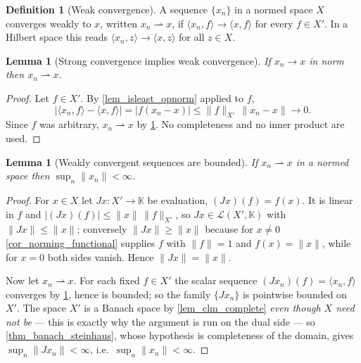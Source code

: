 \documentclass[a4paper]{report}
\theoremstyle{plain}
\newtheorem{lemma}[theorem]{Lemma}
\theoremstyle{definition}
\newtheorem{definition}[theorem]{Definition}
\theoremstyle{remark}
\begin{document}
\begin{definition}[Weak convergence]
  \label{def_weak_conv}
  A sequence $\{x_n\}$ in a normed space $X$ converges weakly to $x$, written
  $x_n \rightharpoonup x$, if $\langle x_n, f\rangle \to \langle x, f\rangle$ for every
  $f \in X'$.  In a Hilbert space this reads
  $\langle x_n, z\rangle \to \langle x, z\rangle$ for all $z \in X$.
\end{definition}



\begin{lemma}[Strong convergence implies weak convergence]
  \label{lem_strong_to_weak}
  If $x_n \to x$ in norm then $x_n \rightharpoonup x$.
\end{lemma}
\begin{proof}
  Let $f \in X'$.  By \cref{lem_isleast_opnorm} applied to $f$,
  \[
    |\langle x_n,f\rangle - \langle x,f\rangle| = |f(x_n-x)| \le \|f\|_{X'}\,\|x_n-x\|
    \longrightarrow 0 .
  \]
  Since $f$ was arbitrary, $x_n \rightharpoonup x$ by \cref{def_weak_conv}.  No
  completeness and no inner product are used.
\end{proof}


\begin{lemma}[Weakly convergent sequences are bounded]
  \label{lem_weak_bounded}
  If $x_n \rightharpoonup x$ in a normed space then $\sup_n\|x_n\| < \infty$.
\end{lemma}
\begin{proof}
  For $x \in X$ let $Jx \colon X' \to \mathbb{K}$ be evaluation, $(Jx)(f) = f(x)$.  It is
  linear in $f$ and $|(Jx)(f)| \le \|x\|\,\|f\|_{X'}$, so
  $Jx \in \mathcal{L}(X',\mathbb{K})$ with $\|Jx\| \le \|x\|$; conversely
  $\|Jx\| \ge \|x\|$ because for $x \ne 0$ \cref{cor_norming_functional} supplies $f$ with
  $\|f\| = 1$ and $f(x) = \|x\|$, while for $x = 0$ both sides vanish.  Hence
  $\|Jx\| = \|x\|$.

  Now let $x_n \rightharpoonup x$.  For each fixed $f \in X'$ the scalar sequence
  $(Jx_n)(f) = \langle x_n,f\rangle$ converges by \cref{def_weak_conv}, hence is bounded;
  so the family $\{Jx_n\}$ is pointwise bounded on $X'$.  The space $X'$ is a Banach space
  by \cref{lem_clm_complete} \emph{even though $X$ need not be} --- this is exactly why the
  argument is run on the dual side --- so \cref{thm_banach_steinhaus}, whose hypothesis is
  completeness of the domain, gives $\sup_n\|Jx_n\| < \infty$, i.e.\
  $\sup_n\|x_n\| < \infty$.
\end{proof}
\end{document}
